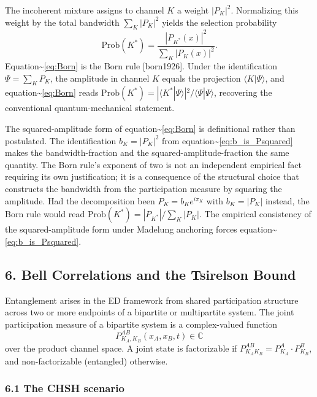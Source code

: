 \documentclass[
  11pt,
]{article}
\begin{document}
The incoherent mixture assigns to channel \(K\) a weight \(|P_K|^2\).
Normalizing this weight by the total bandwidth \(\sum_K |P_K|^2\) yields
the selection probability \begin{equation}
  \mathrm{Prob}(K^*) = \frac{|P_{K^*}(x)|^2}{\sum_K |P_K(x)|^2}.
  \label{eq:Born}
\end{equation} Equation\textasciitilde{}\eqref{eq:Born} is the Born rule
{[}born1926{]}. Under the identification \(\Psi = \sum_K P_K\), the
amplitude in channel \(K\) equals the projection
\(\langle K | \Psi \rangle\), and
equation\textasciitilde{}\eqref{eq:Born} reads
\(\mathrm{Prob}(K^*) = |\langle K^* | \Psi \rangle|^2 / \langle \Psi | \Psi \rangle\),
recovering the conventional quantum-mechanical statement.

The squared-amplitude form of equation\textasciitilde{}\eqref{eq:Born}
is definitional rather than postulated. The identification
\(b_K = |P_K|^2\) from equation\textasciitilde{}\eqref{eq:b_is_Psquared}
makes the bandwidth-fraction and the squared-amplitude-fraction the same
quantity. The Born rule's exponent of two is not an independent
empirical fact requiring its own justification; it is a consequence of
the structural choice that constructs the bandwidth from the
participation measure by squaring the amplitude. Had the decomposition
been \(P_K = b_K e^{i\pi_K}\) with \(b_K = |P_K|\) instead, the Born
rule would read \(\mathrm{Prob}(K^*) = |P_{K^*}| / \sum_K |P_K|\). The
empirical consistency of the squared-amplitude form under Madelung
anchoring forces equation\textasciitilde{}\eqref{eq:b_is_Psquared}.

\subsection{6. Bell Correlations and the Tsirelson
Bound}\label{bell-correlations-and-the-tsirelson-bound}

Entanglement arises in the ED framework from shared participation
structure across two or more endpoints of a bipartite or multipartite
system. The joint participation measure of a bipartite system is a
complex-valued function \begin{equation}
  P^{AB}_{K_A, K_B}(x_A, x_B, t) \in \mathbb{C}
\end{equation} over the product channel space. A joint state is
factorizable if \(P^{AB}_{K_A K_B} = P^A_{K_A} \cdot P^B_{K_B}\), and
non-factorizable (entangled) otherwise.

\subsubsection{6.1 The CHSH scenario}\label{the-chsh-scenario}
\end{document}
